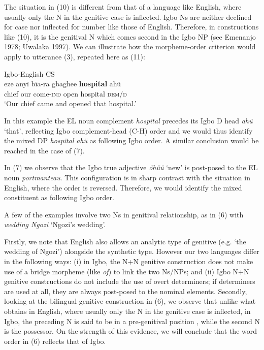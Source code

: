 \documentclass[output=paper]{langsci/langscibook}
\begin{document}
The situation in (10) is different from that of a language like English, where usually only the N in the genitive case is inflected. Igbo Ns are neither declined for case nor inflected for number like those of English. Therefore, in constructions like (10), it is the genitival N which comes second in the Igbo NP (see Emenanjo 1978; Uwalaka 1997). We can illustrate how the morpheme-order criterion would apply to utterance (3), repeated here as (11):

\ea
{Igbo-English CS}\\
\gll eze    anyï  bïa-ra        gbaghee  \textbf{hospital  }ahü \textbf{ }\\
     chief   our  come-\textsc{ind}  open        hospital    \textsc{dem/d}\\
\glt ‘Our chief came and opened that hospital.’
\z

In this example the EL noun complement \textit{hospital }precedes its Igbo D head \textit{ahü} ‘that’, reflecting Igbo complement-head (C-H) order and we would thus identify the mixed DP \textit{hospital}\textbf{\textit{ }}\textit{ahü} as following Igbo order. A similar conclusion would be reached in the case of (7).

In (7) we observe that the Igbo true adjective \textit{öhüü }‘new’ is post-posed to the EL noun \textit{portmanteau}. This configuration is in sharp contrast with the situation in English, where the order is reversed. Therefore, we would identify the mixed constituent as following Igbo order. 

A few of the examples involve two Ns in genitival relationship, as in (6) with \textit{wedding Ngozi }‘Ngozi’s wedding’. 

Firstly, we note that English also allows an analytic type of genitive (e.g. ‘the wedding of Ngozi’) alongside the synthetic type. However our two languages differ in the following ways: (i) in Igbo, the N+N genitive construction does not make use of a bridge morpheme (like \textit{of}) to link the two Ns/NPs; and (ii) Igbo N+N genitive constructions do not include the use of overt determiners; if determiners are used at all, they are always post-posed to the nominal elements. Secondly, looking at the bilingual genitive construction in (6), we observe that unlike what obtains in English, where usually only the N in the genitive case is inflected, in Igbo, the preceding N is said to be in a pre-genitival position \citep{Uwalaka1997}, while the second N is the possessor. On the strength of this evidence, we will conclude that the word order in (6) reflects that of Igbo. 
\end{document}

